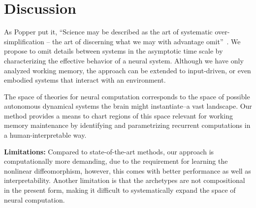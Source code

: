 \documentclass{article}
\theoremstyle{definition} \newtheorem{definition}{Definition}  \newtheorem{example}{Example}
\theoremstyle{remark} \newtheorem{remark}{Remark}
\newcounter{ct}
\begin{document}
\section{Discussion}
As Popper put it, ``Science may be described as the art of systematic over-simplification -- the art of discerning what we may with advantage omit''~\citep{Popper1988}.
We propose to omit details between systems in the asymptotic time scale by characterizing the effective behavior of a neural system.
Although we have only analyzed working memory, the approach can be extended to input-driven, or even embodied systems that interact with an environment.

The space of theories for neural computation corresponds to the space of possible autonomous dynamical systems the brain might instantiate--a vast landscape.
Our method provides a means to chart regions of this space relevant for working memory maintenance by identifying and parametrizing recurrent computations in a human-interpretable way.

\textbf{Limitations:}
Compared to state-of-the-art methods, our approach is computationally more demanding, due to the requirement for learning the nonlinear diffeomorphism, however, this comes with better performance as well as interpretability.
Another limitation is that the archetypes are not compositional in the present form, making it difficult to systematically expand the space of neural computation.




%
%
%
%
\end{document}

